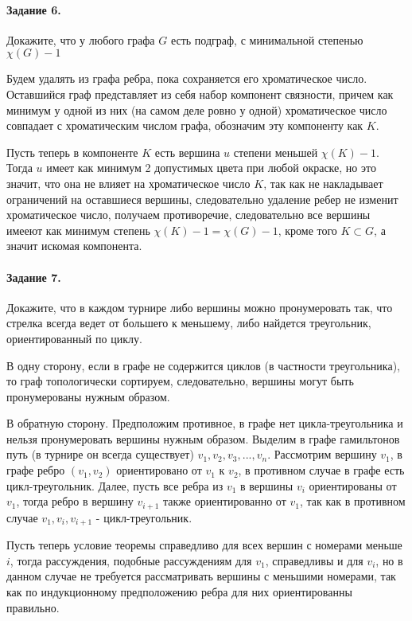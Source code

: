 \documentclass[a4paper,12pt]{article}
\begin{document}
\paragraph{Задание 6.} Докажите, что у любого графа $G$ есть подграф, с минимальной степенью $\chi \left(G\right) - 1$

\begin{Solution}
Будем удалять из графа ребра, пока сохраняется его хроматическое число. Оставшийся граф представляет из себя набор компонент связности, причем как минимум у одной из них (на самом деле ровно у одной) хроматическое число совпадает с хроматическим числом графа, обозначим эту компоненту как $K$.

Пусть теперь в компоненте $K$ есть вершина $u$ степени меньшей $\chi \left(K\right) - 1$. Тогда $u$ имеет как минимум 2 допустимых цвета при любой окраске, но это значит, что она не влияет на хроматическое число $K$, так как не накладывает ограничений на оставшиеся вершины, следовательно удаление ребер не изменит хроматическое число, получаем противоречие, следовательно все вершины имееют как минимум степень $\chi \left(K\right) - 1 = \chi \left(G\right) - 1$, кроме того $K \subset G$, а значит искомая компонента.
\end{Solution}

\paragraph{Задание 7.} Докажите, что в каждом турнире либо вершины можно пронумеровать так, что стрелка всегда ведет от большего к меньшему, либо найдется треугольник, ориентированный по циклу.

\begin{Solution}
В одну сторону, если в графе не содержится циклов (в частности треугольника), то граф топологически сортируем, следовательно, вершины могут быть пронумерованы нужным образом.

В обратную сторону. Предположим противное, в графе нет цикла-треугольника и нельзя пронумеровать вершины нужным образом. Выделим в графе гамильтонов путь (в турнире он всегда существует) $v_1, v_2, v_3, ..., v_n$. Рассмотрим вершину $v_1$, в графе ребро $(v_1,v_2)$ ориентировано от $v_1$ к $v_2$, в противном случае в графе есть цикл-треугольник. Далее, пусть все ребра из $v_1$ в вершины $v_i$ ориентированы от $v_1$, тогда ребро в вершину $v_{i+1}$ также ориентированно от $v_1$, так как в противном случае $v_1, v_i, v_{i+1}$ - цикл-треугольник.

Пусть теперь условие теоремы справедливо для всех вершин с номерами меньше $i$, тогда рассуждения, подобные рассуждениям для $v_1$, справедливы и для $v_i$, но в данном случае не требуется рассматривать вершины с меньшими номерами, так как по индукционному предположению ребра для них ориентированны правильно.
\end{Solution}
\end{document}
